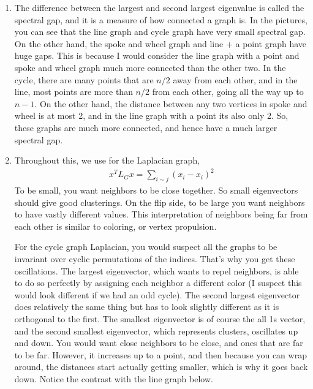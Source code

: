 \documentclass[12pt]{article}
\begin{document}
\begin{enumerate}[leftmargin=\labelsep, label=(\alph*)]
        \item The difference between the largest and second largest eigenvalue is called the spectral gap, and it is a measure of how connected a graph is. In the pictures, you can see that the line graph and cycle graph have very small spectral gap. On the other hand, the spoke and wheel graph and line + a point graph have huge gaps. This is because I would consider the line graph with a point and spoke and wheel graph much more connected than the other two. In the cycle, there are many points that are $n/2$ away from each other, and in the line, most points are more than $n/2$ from each other, going all the way up to $n-1$. On the other hand, the distance between any two vertices in spoke and wheel is at most 2, and in the line graph with a point its also only 2. So, these graphs are much more connected, and hence have a much larger spectral gap.

        \item 
        Throughout this, we use for the Laplacian graph, 
        \begin{align*}
            x^T L_G x = \sum_{i \sim j} (x_i-x_i)^2
        \end{align*}
        To be small, you want neighbors to be close together. So small eigenvectors should give good clusterings. On the flip side, to be large you want neighbors to have vastly different values. This interpretation of neighbors being far from each other is similar to coloring, or vertex propulsion. 

        For the cycle graph Laplacian, you would suspect all the graphs to be invariant over cyclic permutations of the indices. That's why you get these oscillations. The largest eigenvector, which wants to repel neighbors, is able to do so perfectly by assigning each neighbor a different color (I suspect this would look different if we had an odd cycle). The second largest eigenvector does relatively the same thing but has to look slightly different as it is orthogonal to the first. The smallest eigenvector is of course the all 1s vector, and the second smallest eigenvector, which represents clusters, oscillates up and down. You would want close neighbors to be close, and ones that are far to be far. However, it increases up to a point, and then because you can wrap around, the distances start actually getting smaller, which is why it goes back down. Notice the contrast with the line graph below.


\end{enumerate}
\end{document}
